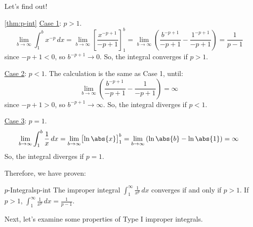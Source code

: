Let's find out!

\begin{Proof}{\ref{thm:p-int}}{}
    \underline{Case 1}: $ p>1 $.
    \[
        \lim\limits_{{b} \to {\infty}} \int_{1}^{b} x^{-p}\, d{x}
        = \lim\limits_{{b} \to {\infty}} \left[\frac{x^{-p+1}}{-p+1}  \right]_{1}^b
        =\lim\limits_{{b} \to {\infty}} \left( \frac{b^{-p+1}}{-p+1}-
        \frac{1^{-p+1}}{-p+1}  \right)
        =\frac{1}{p-1}
    \]
    since $ -p+1<0 $, so $ b^{-p+1}\to 0 $. So, the integral converges if $ p>1 $.

    \underline{Case 2}: $ p<1 $. The calculation is the same as Case 1, until:
    \[ \lim\limits_{{b} \to {\infty}} \left( \frac{b^{-p+1}}{-p+1} -\frac{1}{-p+1}\right) =\infty  \]
    since $ -p+1>0 $, so $ b^{-p+1}\to\infty $. So, the integral diverges if $ p<1 $.

    \underline{Case 3}: $ p=1 $.
    \[
        \lim\limits_{{b} \to {\infty}} \int_{1}^{b} \frac{1}{x} \, d{x}
        =\lim\limits_{{b} \to {\infty}} \bigl[\ln\abs{x}\bigr]_{1}^b
        =\lim\limits_{{b} \to {\infty}} \left( \ln\abs{b}-\ln\abs{1} \right)
        =\infty
    \]
    So, the integral diverges if $ p=1 $.
\end{Proof}

Therefore, we have proven:

\begin{Theorem}{$p$-Integrals}{p-int}
    The improper integral
    $ \displaystyle \int_{1}^{\infty} \frac{1}{x^p} \, d{x}  $
    converges if and only if $ p>1 $.
    If $ p>1 $,
    $ \displaystyle \int_{1}^{\infty} \frac{1}{x^p} \, d{x} =\frac{1}{p-1} $.
\end{Theorem}

Next, let's examine some properties of Type I improper integrals.

